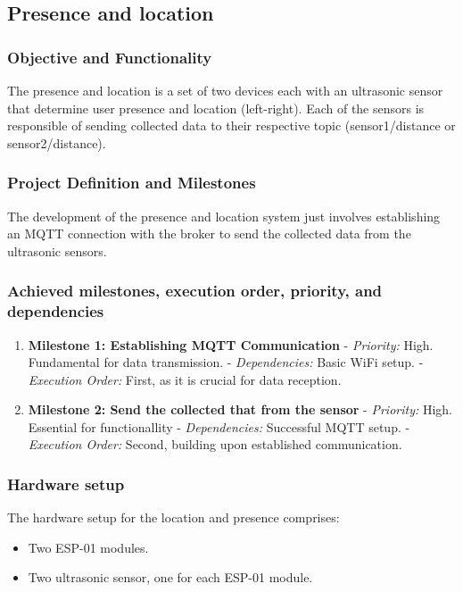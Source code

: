 \documentclass{article}
\begin{document}
\subsection{Presence and location}

\subsubsection{Objective and Functionality}
The presence and location is a set of two devices each with an ultrasonic sensor that determine user presence and location (left-right). Each of the sensors is responsible of sending collected data to their respective topic (sensor1/distance or sensor2/distance).

\subsubsection{Project Definition and Milestones}
The development of the presence and location system just involves establishing an MQTT connection with the broker to send the collected data from the ultrasonic sensors.

\subsubsection{Achieved milestones, execution order, priority, and dependencies}
\begin{enumerate}
    \item \textbf{Milestone 1: Establishing MQTT Communication}
       - \textit{Priority:} High. Fundamental for data transmission.
       - \textit{Dependencies:} Basic WiFi setup.
       - \textit{Execution Order:} First, as it is crucial for data reception.

    \item \textbf{Milestone 2: Send the collected that from the sensor}
       - \textit{Priority:} High. Essential for functionallity
       - \textit{Dependencies:} Successful MQTT setup.
       - \textit{Execution Order:} Second, building upon established communication.
\end{enumerate}

\subsubsection{Hardware setup}
The hardware setup for the location and presence comprises:
\begin{itemize}
    \item Two ESP-01 modules.
    \item Two ultrasonic sensor, one for each ESP-01 module.
\end{itemize}
\end{document}
